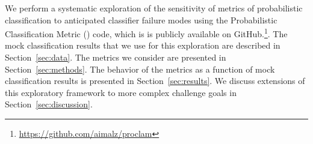 We perform a systematic exploration of the sensitivity of metrics of probabilistic classification to anticipated classifier failure modes using the Probabilistic Classification Metric (\proclam) code, which is is publicly available on GitHub.\footnote{\url{https://github.com/aimalz/proclam}}.
The mock classification results that we use for this exploration are described in Section~\ref{sec:data}.
The metrics we consider are presented in Section~\ref{sec:methods}.
The behavior of the metrics as a function of mock classification results is presented in Section~\ref{sec:results}.
We discuss extensions of this exploratory framework to more complex challenge goals in Section~\ref{sec:discussion}.
